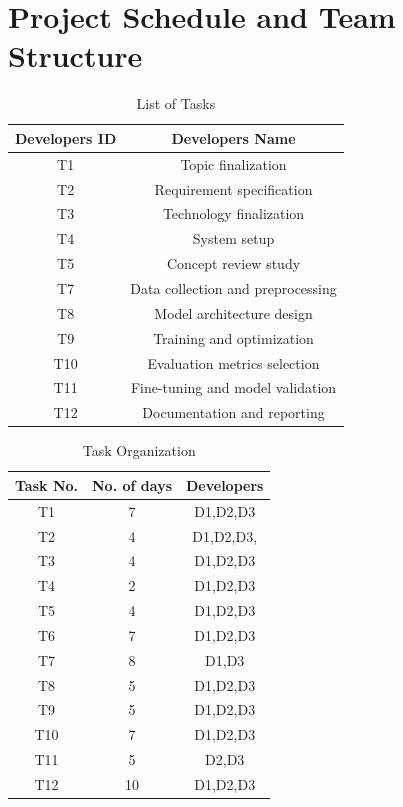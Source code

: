 \documentclass[oneside,a4paper,12pt]{report}
\begin{document}
\section{Project Schedule and Team Structure}
\begin{table}[!htbp]
\begin{center}

\def\arraystretch{1.5}
  \begin{tabular}{| c | c |}
\hline
Developers ID &	Developers Name  \\
\hline
T1 &	 Topic finalization\\
\hline
T2 & Requirement specification\\
\hline
T3 & Technology finalization\\
\hline
T4 & System setup\\
\hline
T5 & Concept review study\\
\hline
T7 & Data collection and preprocessing\\
\hline
T8 & Model architecture design\\
\hline
T9 & Training and optimization\\
\hline
T10 & Evaluation metrics selection\\
\hline
T11 & Fine-tuning and model validation\\
\hline
T12 & Documentation and reporting\\
\hline
\end{tabular}
 \caption {List of Tasks }
 \label{tab:hreq}
\end{center}

\end{table}


\begin{table}[!htbp]
\begin{center}

\def\arraystretch{1.5}
  \begin{tabular}{| c | c | c |}
\hline
Task No. &	No. of days & Developers \\
\hline
T1 &	7  & D1,D2,D3\\
\hline
T2 &	4 &D1,D2,D3,\\
 \hline
T3 & 4 & D1,D2,D3\\
 \hline
 T4 &	2  & D1,D2,D3\\
\hline
T5 &	4 & D1,D2,D3\\
 \hline
T6 & 7 & D1,D2,D3\\
 \hline
 T7 &	8 & D1,D3\\
\hline
T8 &	5 &  D1,D2,D3\\
 \hline
T9 & 5 & D1,D2,D3\\
 \hline
 T10 &	7  &D1,D2,D3\\
\hline
T11 &	5 & D2,D3\\
 \hline
T12 & 10 & D1,D2,D3\\
 \hline
\end{tabular}
 \caption { Task Organization }
 \label{tab:hreq}
\end{center}

\end{table}
\end{document}
